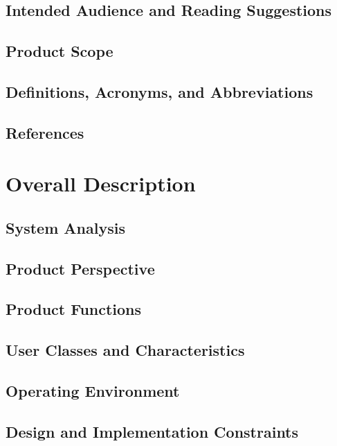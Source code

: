 \documentclass[11pt]{article}
\begin{document}
\subsection{Intended Audience and Reading Suggestions}
\label{sec:audience}

\subsection{Product Scope}
\label{sec:scope}

\subsection{Definitions, Acronyms, and Abbreviations}
\label{sec:definitions}

\subsection{References}
\label{sec:references}

\section{Overall Description}
\label{sec:overall}

\subsection{System Analysis}
\label{sec:analysis}

\subsection{Product Perspective}
\label{sec:perspective}

\subsection{Product Functions}
\label{sec:functions}

\subsection{User Classes and Characteristics}
\label{sec:classes}

\subsection{Operating Environment}
\label{sec:environment}

\subsection{Design and Implementation Constraints}
\label{sec:constraints}
\end{document}
